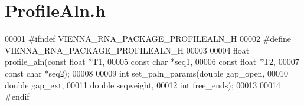 \hypertarget{ProfileAln_8h_source}{}\section{Profile\+Aln.\+h}
\label{ProfileAln_8h_source}

\begin{DoxyCode}
00001 \textcolor{preprocessor}{#ifndef VIENNA\_RNA\_PACKAGE\_PROFILEALN\_H}
00002 \textcolor{preprocessor}{#define VIENNA\_RNA\_PACKAGE\_PROFILEALN\_H}
00003 
00004 \textcolor{keywordtype}{float} profile\_aln(\textcolor{keyword}{const} \textcolor{keywordtype}{float} *T1,
00005                   \textcolor{keyword}{const} \textcolor{keywordtype}{char} *seq1,
00006                   \textcolor{keyword}{const} \textcolor{keywordtype}{float} *T2,
00007                   \textcolor{keyword}{const} \textcolor{keywordtype}{char} *seq2);
00008 
00009 \textcolor{keywordtype}{int} set\_paln\_params(\textcolor{keywordtype}{double} gap\_open,
00010                     \textcolor{keywordtype}{double} gap\_ext,
00011                     \textcolor{keywordtype}{double} seqweight,
00012                     \textcolor{keywordtype}{int} free\_ends);
00013 
00014 \textcolor{preprocessor}{#endif}
\end{DoxyCode}
